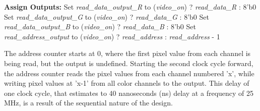 \begin{algorithm}[H]
\begin{algorithmic}[1]
		\State
		
		\State \textbf{Assign Outputs:}
		\State Set \textit{read\_data\_output\_R} to (\textit{video\_on}) ? \textit{read\_data\_R} : 8'b0
		\State Set \textit{read\_data\_output\_G} to (\textit{video\_on}) ? \textit{read\_data\_G} : 8'b0
		\State Set \textit{read\_data\_output\_B} to (\textit{video\_on}) ? \textit{read\_data\_B} : 8'b0
		\State Set \textit{read\_address\_output} to (\textit{video\_on}) ? \textit{read\_address} : \textit{read\_address} - 1
	\end{algorithmic}
\end{algorithm}

\par The address counter starts at 0, where the first pixel value from each channel is being read, but the output is undefined. Starting the second clock cycle forward, the address counter reads the pixel values from each channel numbered 'x', while writing pixel values at 'x-1' from all color channels to the output. This delay of one clock cycle, that estimates to 40 nanoseconds (ns) delay at a frequency of 25 MHz, is a result of the sequential nature of the design. \newline

